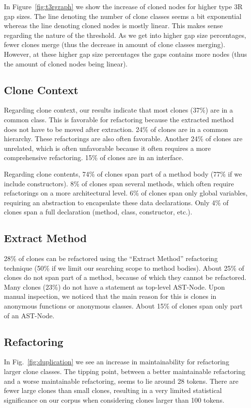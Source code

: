 In Figure~\ref{fig:t3rgraph} we show the increase of cloned nodes for higher type 3R gap sizes. The line denoting the number of clone classes seems a bit exponential whereas the line denoting cloned nodes is mostly linear. This makes sense regarding the nature of the threshold. As we get into higher gap size percentages, fewer clones merge (thus the decrease in amount of clone classes merging). However, at these higher gap size percentages the gaps contains more nodes (thus the amount of cloned nodes being linear).

\subsection{Clone Context}
Regarding clone context, our results indicate that most clones (37\%) are in a common class. This is favorable for refactoring because the extracted method does not have to be moved after extraction. 24\% of clones are in a common hierarchy. These refactorings are also often favorable. Another 24\% of clones are unrelated, which is often unfavorable because it often requires a more comprehensive refactoring. 15\% of clones are in an interface.

Regarding clone contents, 74\% of clones span part of a method body (77\% if we include constructors). 8\% of clones span several methods, which often require refactorings on a more architectural level. 6\% of clones span only global variables, requiring an abstraction to encapsulate these data declarations. Only 4\% of clones span a full declaration (method, class, constructor, etc.).

\subsection{Extract Method}
28\% of clones can be refactored using the ``Extract Method'' refactoring technique (50\% if we limit our searching scope to method bodies). About 25\% of clones do not span part of a method, because of which they cannot be refactored. Many clones (23\%) do not have a statement as top-level AST-Node. Upon manual inspection, we noticed that the main reason for this is clones in anonymous functions or anonymous classes. About 15\% of clones span only part of an AST-Node.

\subsection{Refactoring}
In Fig.~\ref{fig:duplication} we see an increase in maintainability for refactoring larger clone classes. The tipping point, between a better maintainable refactoring and a worse maintainable refactoring, seems to lie around 28 tokens. There are fewer large clones than small clones, resulting in a very limited statistical significance on our corpus when considering clones larger than 100 tokens.

